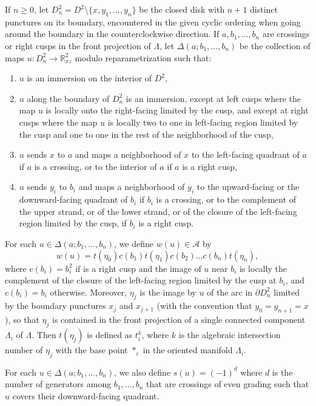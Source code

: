 \documentclass[11pt]{amsart}
\theoremstyle{plain}
\theoremstyle{remark}
\numberwithin{equation}{section}
\newcommand{\R}{\ensuremath{\mathbb{R}}}
\begin{document}
If $n \ge 0$, let $D^2_n = D^2 \setminus \{ x, y_1, \ldots, y_n \}$ be the closed disk with $n+1$ distinct punctures on its boundary, encountered 
in the given cyclic ordering when going around the boundary in the counterclockwise direction.
If $a, b_1, \ldots, b_n$ are crossings or right cusps in the front projection of $\Lambda$, let $\Delta(a;b_1, \ldots, b_n)$ be the collection of maps
$u: D^2_n \to \R^2_{xz}$ modulo reparametrization such that:
\begin{enumerate}
\item $u$ is an immersion on the interior of $D^2$,
\item  $u$ along the boundary of $D^2_n$ is an immersion, except at left cusps where the map $u$ is locally onto the right-facing limited by the cusp,
and except at right cusps where the map $u$ is locally two to one in left-facing region limited by the cusp and one to one in the rest of the neighborhood 
of the cusp,
\item $u$ sends $x$ to $a$ and maps a neighborhood of $x$ to the left-facing quadrant of $a$ if $a$ is a crossing, or to the interior of $a$
if $a$ is a right cusp,
\item $u$ sends $y_i$ to $b_i$ and maps a neighborhood of $y_i$ to the upward-facing or the downward-facing quadrant of $b_i$ if $b_i$ is a crossing,
or to the complement of the upper strand, or of the lower strand, or of the closure of the left-facing region limited by the cusp, if $b_i$ is a right cusp.
\end{enumerate}

For each $u \in \Delta(a;b_1, \ldots, b_n)$, we define $w(u) \in \mathcal{A}$ by
 $$
 w(u) = t(\eta_0) c(b_1) t(\eta_1) c(b_2) \ldots c(b_n) t(\eta_n),
 $$
where $c(b_i) = b_i^2$ if is a right cusp and the image of $u$ near $b_i$ is locally the complement of the closure of the left-facing region limited by the cusp
at $b_i$, and $c(b_i) = b_i$ otherwise. Moreover, $\eta_j$ is the image by $u$ of the arc in $\partial D^2_n$ limited by the boundary punctures $x_j$ and 
$x_{j+1}$ (with the convention that $y_0 = y_{n+1} = x$), so that $\eta_j$ is contained in the front projection of a single connected component $\Lambda_i$ 
of $\Lambda$. Then $t(\eta_j)$ is defined as $t_i^k$, where $k$ is the algebraic intersection number of $\eta_j$ with the base point $*_i$ in the oriented manifold
$\Lambda_i$. 

For each $u \in \Delta(a;b_1, \ldots, b_n)$, we also define $s(u)= (-1)^d$ where $d$ is the number of generators among $b_1, \ldots, b_n$ that are crossings
of even grading such that $u$ covers their downward-facing quadrant.
\end{document}
